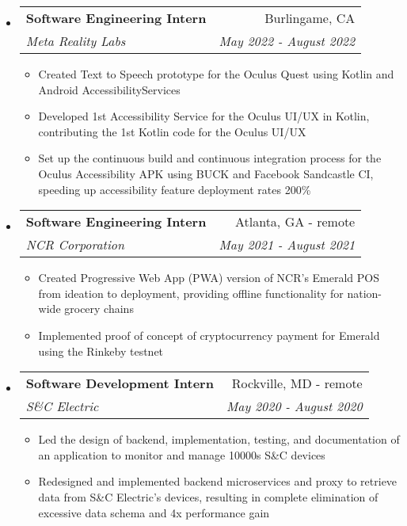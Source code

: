 \documentclass[letterpaper,10pt]{article}
\makeatletter
\newcommand{\resitem}[1]{\item #1 \vspace{-3.5pt}}
\newcommand{\ressubheading}[4]{
\begin{tabular*}{7.0in}{l@{\extracolsep{\fill}}r}
		\textbf{#1} & #2 \\
		\textit{#3} & \textit{#4} \\
\end{tabular*}\vspace{-6pt}}
\makeatother
\begin{document}
\begin{itemize}
\item
    \ressubheading{Software Engineering Intern}{Burlingame, CA}{Meta Reality Labs}{May 2022 - August 2022}
    \begin{itemize}
        \resitem{Created Text to Speech prototype for the Oculus Quest using Kotlin and Android AccessibilityServices}
        \resitem{Developed 1st Accessibility Service for the Oculus UI/UX in Kotlin, contributing the 1st Kotlin code for the Oculus UI/UX}
        \resitem{Set up the continuous build and continuous integration process for the Oculus Accessibility APK using BUCK and Facebook Sandcastle CI, speeding up accessibility feature deployment rates 200\%}
    \end{itemize}
\item
    \ressubheading{Software Engineering Intern}{Atlanta, GA - remote}{NCR Corporation}{May 2021 - August 2021}
    \begin{itemize}
        \resitem{Created Progressive Web App (PWA) version of NCR's Emerald POS from ideation to deployment, providing offline functionality for nation-wide grocery chains}
        \resitem{Implemented proof of concept of cryptocurrency payment for Emerald using the Rinkeby testnet}
    \end{itemize}
\item
    \ressubheading{Software Development Intern}{Rockville, MD - remote}{S\&C Electric}{May 2020 - August 2020}
    \begin{itemize}
        \resitem{Led the design of backend, implementation, testing, and documentation of an application to monitor and manage 10000s S\&C devices}
        \resitem{Redesigned and implemented backend microservices and proxy to retrieve data from S\&C Electric's devices, resulting in complete elimination of excessive data schema and 4x performance gain}

\end{itemize}
\end{itemize}
\end{document}
